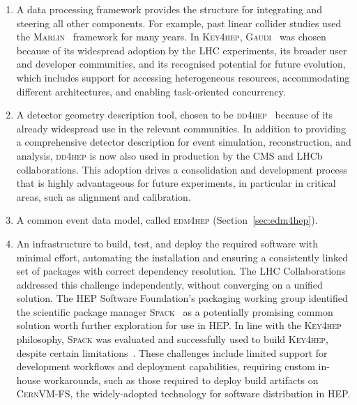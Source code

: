 \begin{enumerate}

\item A data processing framework provides the structure for integrating and steering all other components. 
For example, past linear collider studies used the \textsc{Marlin}~\cite{Marlin} framework for many years. 
In \textsc{Key4hep}, \textsc{Gaudi}~\cite{Gaudi} was chosen because of 
its widespread adoption by the LHC experiments,
its broader user and developer communities, 
and its recognised potential for future evolution, 
which includes support for accessing heterogeneous resources, 
accommodating different architectures, and enabling task-oriented concurrency.

\item A detector geometry description tool, 
chosen to be \textsc{dd4hep}~\cite{dd4hep} because of its already widespread use in the relevant communities. 
In addition to providing a comprehensive detector description for event simulation, reconstruction, and analysis, 
\textsc{dd4hep} is now also used in production by the CMS and LHCb collaborations. 
This adoption drives a consolidation and development process that is highly advantageous for future experiments, 
in particular in critical areas, such as alignment and calibration.

\item A common event data model, called \textsc{edm4hep} (Section~\ref{sec:edm4hep}).

\item An infrastructure to build, test, and deploy the required software with minimal effort, 
automating the installation and ensuring a consistently linked set of packages with correct dependency resolution. 
The LHC Collaborations addressed this challenge independently, without converging on a unified solution. 
The HEP Software Foundation's packaging working group identified the scientific package manager \textsc{Spack}~\cite{Spack} 
as a potentially promising common solution worth further exploration for use in HEP. 
In line with the \textsc{Key4hep} philosophy, 
\textsc{Spack} was evaluated and successfully used to build \textsc{Key4hep}, 
despite certain limitations~\cite{SPack-CHEP2024-K4H}. 
These challenges include limited support for development workflows and deployment capabilities, 
requiring custom in-house workarounds, 
such as those required to deploy build artifacts on \textsc{CernVM-FS}, 
the widely-adopted technology for software distribution in HEP.

\end{enumerate}

